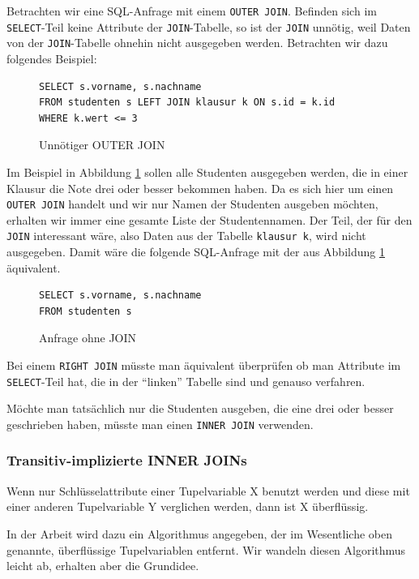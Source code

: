 Betrachten wir eine SQL-Anfrage mit einem \verb|OUTER JOIN|. Befinden sich im \verb|SELECT|-Teil keine Attribute der \verb|JOIN|-Tabelle, so ist der \verb|JOIN| unnötig, weil Daten von der \verb|JOIN|-Tabelle ohnehin nicht ausgegeben werden. Betrachten wir dazu folgendes Beispiel:

\begin{figure}[h]
\begin{lstlisting}[mathescape]
SELECT s.vorname, s.nachname 
FROM studenten s LEFT JOIN klausur k ON s.id = k.id 
WHERE k.wert <= 3
\end{lstlisting}
\caption{Unnötiger OUTER JOIN}
\label{fig:joinelem1}
\end{figure}

Im Beispiel in Abbildung \ref{fig:joinelem1} sollen alle Studenten ausgegeben werden, die in einer Klausur die Note drei oder besser bekommen haben. Da es sich hier um einen \verb|OUTER JOIN| handelt und wir nur Namen der Studenten ausgeben möchten, erhalten wir immer eine gesamte Liste der Studentennamen. Der Teil, der für den \verb|JOIN| interessant wäre, also Daten aus der Tabelle \verb|klausur k|, wird nicht ausgegeben. Damit wäre die folgende SQL-Anfrage mit der aus Abbildung \ref{fig:joinelem1} äquivalent.

\begin{figure}[h]
\begin{lstlisting}[mathescape]
SELECT s.vorname, s.nachname 
FROM studenten s 
\end{lstlisting}
\caption{Anfrage ohne JOIN}
\label{fig:joinelem2}
\end{figure}

Bei einem \verb|RIGHT JOIN| müsste man äquivalent überprüfen ob man Attribute im \verb|SELECT|-Teil hat, die in der ``linken'' Tabelle sind und genauso verfahren.

Möchte man tatsächlich nur die Studenten ausgeben, die eine drei oder besser geschrieben haben, müsste man einen \verb|INNER JOIN| verwenden.

\subsubsection{Transitiv-implizierte INNER JOINs}

Wenn nur Schlüsselattribute einer Tupelvariable X benutzt werden und diese mit  einer anderen Tupelvariable Y verglichen werden, dann ist X überflüssig.

In der Arbeit \cite{joinelem2} wird dazu ein Algorithmus angegeben, der im Wesentliche oben genannte, überflüssige Tupelvariablen entfernt. Wir wandeln diesen Algorithmus leicht ab, erhalten aber die Grundidee.

